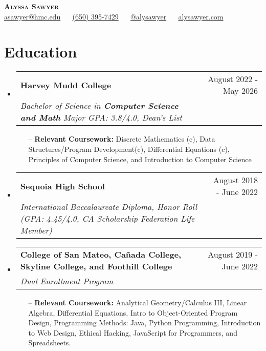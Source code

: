 \documentclass[letterpaper,10pt]{article}
\makeatletter
\newcommand{\resumeSubheading}[4]{
  \vspace{-2pt}\item
    \begin{tabular*}{0.97\textwidth}[t]{l@{\extracolsep{\fill}}r}
      \textbf{#1} & #2 \\
      \textit{\small#3} & \textit{\small #4} \\
    \end{tabular*}\vspace{-7pt}
}
\newcommand{\resumeSubHeadingListStart}{\begin{itemize}[leftmargin=0.15in, label={}]}
\newcommand{\resumeSubHeadingListEnd}{\end{itemize}}
\makeatother
\begin{document}
\begin{center}
    \textbf{\huge \scshape Alyssa Sawyer} \\ \vspace{3pt}
    \faEnvelope{} \href{asawyer@hmc.edu}{asawyer@hmc.edu} $\quad$ 
    \faPhone{} \href{tel:6503957429}{(650) 395-7429} $\quad$
    \faLinkedin{} \href{https://www.linkedin.com/in/alysawyer/}{@alysawyer} $\quad$
    \faGlobe{} \href{https://alysawyer.com}{alysawyer.com} $\quad$
\end{center}


\section{Education}
  \resumeSubHeadingListStart
    \resumeSubheading
      {Harvey Mudd College}{August 2022 - May 2026}
      {Bachelor of Science in \textbf{Computer Science and Math} Major GPA: 3.8/4.0, Dean's List}{}
        \begin{itemize}\small
        \setlength\itemsep{0em}
            \item[--] \textbf{Relevant Coursework:} Discrete Mathematics (c), Data Structures/Program Development(c), Differential Equations (c), Principles of Computer Science, and Introduction to Computer Science
        \end{itemize}
    \vspace{-5pt}
    \resumeSubheading
      {Sequoia High School}{August 2018 - June 2022}
      {International Baccalaureate Diploma, Honor Roll (GPA: 4.45/4.0, CA Scholarship Federation Life Member)}{} 
    \vspace{5pt}
    \resumeSubheading
      {College of San Mateo, Cañada College, Skyline College, and Foothill College}{August 2019 - June 2022}
      {Dual Enrollment Program}{}
        \begin{itemize}\small
        \setlength\itemsep{0em}
            \item[--] \textbf{Relevant Coursework:} Analytical Geometry/Calculus III, Linear Algebra, Differential Equations, Intro to Object-Oriented Program Design, Programming Methods: Java, Python Programming,
Introduction to Web Design, Ethical Hacking, JavaScript for Programmers, and Spreadsheets.
        \end{itemize}    
        
        
  \resumeSubHeadingListEnd
\end{document}
